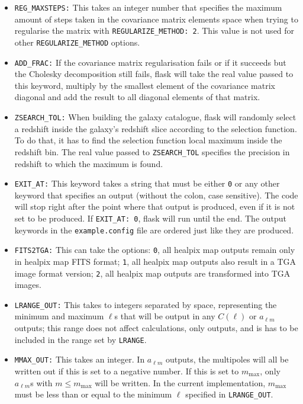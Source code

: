 \documentclass[12pt]{book} %
\newcommand{\nv}[1]{\mathrm{#1}}                 %
\begin{document}
\begin{itemize}
\item {\tt REG\_MAXSTEPS:} This takes an integer number that specifies the maximum amount of 
  steps taken in the covariance matrix elements space when trying to regularise the matrix 
  with {\tt REGULARIZE\_METHOD: 2}. This value is not used for other {\tt REGULARIZE\_METHOD} 
  options. 

\item {\tt ADD\_FRAC:} If the covariance matrix regularisation fails or if it succeeds but the 
  Cholesky decomposition still fails, {\sc flask} will take the real value passed to this keyword, 
  multiply by the smallest element of the covariance matrix diagonal and add the result to all 
  diagonal elements of that matrix. 

\item {\tt ZSEARCH\_TOL:} When building the galaxy catalogue, {\sc flask} will randomly select 
  a redshift inside the galaxy's redshift slice according to the selection function. To do that, 
  it has to find the selection function local maximum inside the redshift bin. The real value 
  passed to {\tt ZSEARCH\_TOL} specifies the precision in redshift to which the maximum is found.

\item {\tt EXIT\_AT:} This keyword takes a string that must be either {\tt 0} or any other keyword
  that specifies an output (without the colon, case sensitive). The code will stop right after 
  the point where that output is produced, even if it is not set to be produced. If {\tt EXIT\_AT: 0}, 
  {\sc flask} will run until the end. The output keywords in the {\tt example.config} file 
  are ordered just like they are produced.

\item {\tt FITS2TGA:} This can take the options: {\tt 0}, all {\sc healpix} map outputs remain only 
  in {\sc healpix} map FITS format; {\tt 1}, all {\sc healpix} map outputs also result in a TGA
  image format version; {\tt 2}, all {\sc healpix} map outputs are transformed into TGA images.

\item {\tt LRANGE\_OUT:} This takes to integers separated by space, representing the minimum and 
  maximum $\ell$s that will be output in any $C(\ell)$ or $a_{\ell m}$ outputs; this range does 
  not affect calculations, only outputs, and is has to be included in the range set by {\tt LRANGE}.
  
\item {\tt MMAX\_OUT:} This takes an integer. In $a_{\ell m}$ outputs, the multipoles will all 
  be written out if this is set to a negative number. If this is set to $m_{\nv{max}}$, only $a_{\ell m}$s 
  with $m\leq m_{\nv{max}}$ will be written. In the current implementation, $m_{\nv{max}}$ must be less than 
  or equal to the minimum $\ell$ specified in {\tt LRANGE\_OUT}.


\end{itemize}
\end{document}
